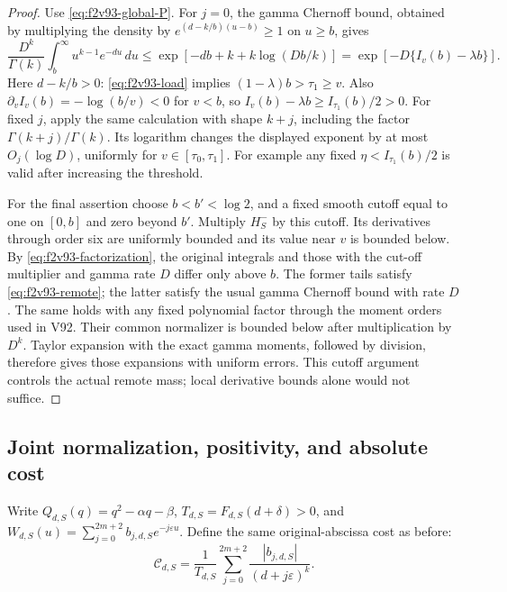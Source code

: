 \documentclass[11pt]{article}
\theoremstyle{definition}
\theoremstyle{remark}
\begin{document}
\begin{proof}
Use \eqref{eq:f2v93-global-P}.  For \(j=0\), the gamma Chernoff
bound, obtained by multiplying the density by
\(e^{(d-k/b)(u-b)}\ge1\) on \(u\ge b\), gives
\[
 \frac{D^k}{\Gamma(k)}\int_b^\infty u^{k-1}e^{-du}\,du
 \le \exp[-db+k+k\log(Db/k)]
 =\exp[-D\{I_v(b)-\lambda b\}].
\]
Here \(d-k/b>0\): \eqref{eq:f2v93-load} implies
\((1-\lambda)b>\tau_1\ge v\).  Also
\(\partial_v I_v(b)=-\log(b/v)<0\) for \(v<b\), so
\(I_v(b)-\lambda b\ge I_{\tau_1}(b)/2>0\).
For fixed \(j\), apply the same calculation with shape \(k+j\),
including the factor \(\Gamma(k+j)/\Gamma(k)\).  Its logarithm
changes the displayed exponent by at most \(O_j(\log D)\),
uniformly for \(v\in[\tau_0,\tau_1]\).  For example any fixed
\(\eta<I_{\tau_1}(b)/2\) is valid after increasing the threshold.

For the final assertion choose \(b<b'<\log2\), and a fixed smooth
cutoff equal to one on \([0,b]\) and zero beyond \(b'\).
Multiply \(H_S^-\) by this cutoff.  Its derivatives through order
six are uniformly bounded and its value near \(v\) is bounded below.
By \eqref{eq:f2v93-factorization}, the original integrals and those
with the cut-off multiplier and gamma rate \(D\) differ only above
\(b\).  The former tails satisfy \eqref{eq:f2v93-remote}; the
latter satisfy the usual gamma Chernoff bound with rate \(D\).
The same holds with any fixed polynomial factor through the moment
orders used in V92.  Their common normalizer is bounded below after
multiplication by \(D^k\).  Taylor expansion with the exact gamma
moments, followed by division, therefore gives those expansions with
uniform errors.  This cutoff argument controls the actual remote
mass; local derivative bounds alone would not suffice.
\end{proof}

\subsection{Joint normalization, positivity, and absolute cost}

Write \(Q_{d,S}(q)=q^2-\alpha q-\beta\),
\(T_{d,S}=F_{d,S}(d+\delta)>0\), and
\(W_{d,S}(u)=\sum_{j=0}^{2m+2}b_{j,d,S}e^{-j\varepsilon u}\).
Define the same original-abscissa cost as before:
\begin{equation}
 \mathcal C_{d,S}=\frac1{T_{d,S}}
     \sum_{j=0}^{2m+2}\frac{|b_{j,d,S}|}{(d+j\varepsilon)^k}.
 \label{eq:f2v93-cost-definition}
\end{equation}
\end{document}
